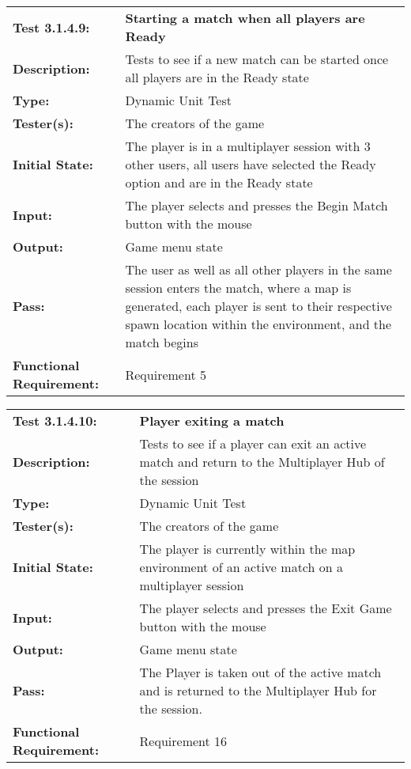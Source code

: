 \documentclass[12pt, titlepage]{article}
\begin{document}
\begin{mdframed}[linewidth=1pt]
\begin{tabularx}{\textwidth}{@{}p{3cm}X@{}}
{\bf Test 3.1.4.9:} & {\bf Starting a match when all players are Ready}\\[\baselineskip]
{\bf Description:} & Tests to see if a new match can be started once all players are in the Ready state\\[0.5\baselineskip]
{\bf Type:} & Dynamic Unit Test\\[0.5\baselineskip]
{\bf Tester(s):} & The creators of the game\\[0.5\baselineskip]
{\bf Initial State:} & The player is in a multiplayer session with 3 other users, all users have selected the Ready option and are in the Ready state\\[0.5\baselineskip]
{\bf Input:} & The player selects and presses the Begin Match button with the mouse \\[0.5\baselineskip]
{\bf Output:} & Game menu state\\[0.5\baselineskip]
{\bf Pass:} & The user as well as all other players in the same session enters the match, where a map is generated, each player is sent to their respective spawn location within the environment, and the match begins \\[0.5\baselineskip]
{\bf Functional Requirement:} & Requirement 5
\end{tabularx}
\end{mdframed}

\begin{mdframed}[linewidth=1pt]
\begin{tabularx}{\textwidth}{@{}p{3cm}X@{}}
{\bf Test 3.1.4.10:} & {\bf Player exiting a match }\\[\baselineskip]
{\bf Description:} & Tests to see if a player can exit an active match and return to the Multiplayer Hub of the session\\[0.5\baselineskip]
{\bf Type:} & Dynamic Unit Test\\[0.5\baselineskip]
{\bf Tester(s):} & The creators of the game\\[0.5\baselineskip]
{\bf Initial State:} & The player is currently within the map environment of an active match on a multiplayer session \\[0.5\baselineskip]
{\bf Input:} & The player selects and presses the Exit Game button with the mouse \\[0.5\baselineskip]
{\bf Output:} & Game menu state\\[0.5\baselineskip]
{\bf Pass:} & The Player is taken out of the active match and is returned to the Multiplayer Hub for the session. \\[0.5\baselineskip]
{\bf Functional Requirement:} & Requirement 16
\end{tabularx}
\end{mdframed}
\end{document}
